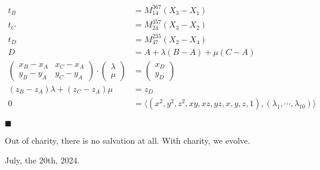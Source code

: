 \documentclass[12pt]{article}
\begin{document}
\begin{align}
t_B &= M_{14}^{367} (X_3 - X_1)\\
t_C &= M_{24}^{357} (X_3 - X_2) \\
t_D &= M_{47}^{235} (X_2 - X_4) \\
D &= A + \lambda (B - A) + \mu (C - A) \\
\begin{pmatrix}
    x_B - x_A & x_C - x_A \\
    y_B - y_A & y_C - y_A
\end{pmatrix} \cdot \begin{pmatrix}
    \lambda \\ \mu
\end{pmatrix} &= \begin{pmatrix}
    x_D \\ y_D 
\end{pmatrix} \\
(z_B - z_A) \lambda + (z_C - z_A)\mu &= z_D \\
0 &= \langle (x^2, y^2, z^2, xy, xz, yz, x, y, z, 1), (\lambda_1, \cdots, \lambda_{10})\rangle
\end{align}

$\blacksquare$

\vspace{12mm}

Out of charity, there is no salvation at all. With charity, we evolve.

July, the 20th, 2024.

%
\end{document}
